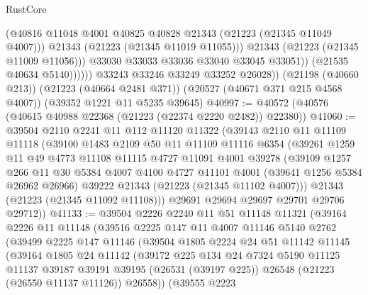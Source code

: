 \begin{lexlean}{RustCore}
\begin{coremodule}
                          (@40816 @11048 @4001 @40825 @40828 @21343 (@21223 (@21345 @11049 @4007)))
                          @21343
                          (@21223 (@21345 @11019 @11055)))
                        @21343
                        (@21223 (@21345 @11009 @11056)))
                      @33030
                      @33033
                      @33036
                      @33040
                      @33045
                      @33051))
                  (@21535 @40634 @5140))))))
        @33243
        @33246
        @33249
        @33252
        @26028))
    (@21198 (@40660 @213))
    (@21223 (@40664 @2481 @371))
    (@20527 (@40671 @371 @215 @4568 @4007))
    (@39352 @1221 @11 @5235 @39645)
@40997 := @40572 (@40576 (@40615 @40988 @22368 (@21223 (@22374 @2220 @2482)) @22380))
@41060 := @39504
    @2110
    @2241
    @11
    @112
    @11120
    @11322
    (@39143
      @2110
      @11
      @11109
      @11118
      (@39100
        @1483
        @2109
        @50
        @11
        @11109
        @11116
        @6354
        (@39261
          @1259
          @11
          @49
          @4773
          @11108
          @11115
          @4727
          @11091
          @4001
          @39278
          (@39109
            @1257
            @266
            @11
            @30
            @5384
            @4007
            @4100
            @4727
            @11101
            @4001
            (@39641 @1256 @5384 @26962 @26966)
            @39222
            @21343
            (@21223 (@21345 @11102 @4007)))
          @21343
          (@21223 (@21345 @11092 @11108)))
        @29691
        @29694
        @29697
        @29701
        @29706
        @29712))
@41133 := @39504
    @2226
    @2240
    @11
    @51
    @11148
    @11321
    (@39164
      @2226
      @11
      @11148
      (@39516
        @2225
        @147
        @11
        @4007
        @11146
        @5140
        @2762
        (@39499
          @2225
          @147
          @11146
          (@39504
            @1805
            @2224
            @24
            @51
            @11142
            @11145
            (@39164
              @1805
              @24
              @11142
              (@39172
                @225
                @134
                @24
                @7324
                @5190
                @11125
                @11137
                @39187
                @39191
                @39195
                (@26531 (@39197 @225))
                @26548
                (@21223 (@26550 @11137 @11126))
                @26558))
            (@39555
              @2223

\end{coremodule}
\end{lexlean}
